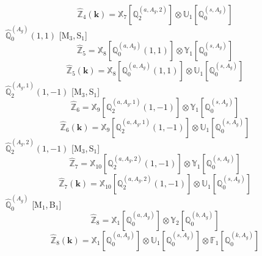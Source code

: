 \documentclass[fleqn,10pt,landscape]{article}
\begin{document}
\begin{itemize}
\begin{dmath*}
\hat{\mathbb{Z}}_{4}(\bm{k})=\mathbb{X}_{7}[\mathbb{Q}_{2}^{(a,A_{g},2)}] \otimes\mathbb{U}_{1}[\mathbb{Q}_{0}^{(s,A_{g})}]
\end{dmath*}
\vspace{4mm}
\noindent {} $\,\,\,\hat{\mathbb{Q}}_{0}^{(A_{g})}(1,1)$ [M$_{3}$,\,S$_{1}$]
\begin{dmath*}
\hat{\mathbb{Z}}_{5}=\mathbb{X}_{8}[\mathbb{Q}_{0}^{(a,A_{g})}(1,1)] \otimes\mathbb{Y}_{1}[\mathbb{Q}_{0}^{(s,A_{g})}]
\end{dmath*}
\begin{dmath*}
\hat{\mathbb{Z}}_{5}(\bm{k})=\mathbb{X}_{8}[\mathbb{Q}_{0}^{(a,A_{g})}(1,1)] \otimes\mathbb{U}_{1}[\mathbb{Q}_{0}^{(s,A_{g})}]
\end{dmath*}
\vspace{4mm}
\noindent {} $\,\,\,\hat{\mathbb{Q}}_{2}^{(A_{g},1)}(1,-1)$ [M$_{3}$,\,S$_{1}$]
\begin{dmath*}
\hat{\mathbb{Z}}_{6}=\mathbb{X}_{9}[\mathbb{Q}_{2}^{(a,A_{g},1)}(1,-1)] \otimes\mathbb{Y}_{1}[\mathbb{Q}_{0}^{(s,A_{g})}]
\end{dmath*}
\begin{dmath*}
\hat{\mathbb{Z}}_{6}(\bm{k})=\mathbb{X}_{9}[\mathbb{Q}_{2}^{(a,A_{g},1)}(1,-1)] \otimes\mathbb{U}_{1}[\mathbb{Q}_{0}^{(s,A_{g})}]
\end{dmath*}
\vspace{4mm}
\noindent {} $\,\,\,\hat{\mathbb{Q}}_{2}^{(A_{g},2)}(1,-1)$ [M$_{3}$,\,S$_{1}$]
\begin{dmath*}
\hat{\mathbb{Z}}_{7}=\mathbb{X}_{10}[\mathbb{Q}_{2}^{(a,A_{g},2)}(1,-1)] \otimes\mathbb{Y}_{1}[\mathbb{Q}_{0}^{(s,A_{g})}]
\end{dmath*}
\begin{dmath*}
\hat{\mathbb{Z}}_{7}(\bm{k})=\mathbb{X}_{10}[\mathbb{Q}_{2}^{(a,A_{g},2)}(1,-1)] \otimes\mathbb{U}_{1}[\mathbb{Q}_{0}^{(s,A_{g})}]
\end{dmath*}
\vspace{4mm}
\noindent {} $\,\,\,\hat{\mathbb{Q}}_{0}^{(A_{g})}$ [M$_{1}$,\,B$_{1}$]
\begin{dmath*}
\hat{\mathbb{Z}}_{8}=\mathbb{X}_{1}[\mathbb{Q}_{0}^{(a,A_{g})}] \otimes\mathbb{Y}_{2}[\mathbb{Q}_{0}^{(b,A_{g})}]
\end{dmath*}
\begin{dmath*}
\hat{\mathbb{Z}}_{8}(\bm{k})=\mathbb{X}_{1}[\mathbb{Q}_{0}^{(a,A_{g})}] \otimes\mathbb{U}_{1}[\mathbb{Q}_{0}^{(s,A_{g})}] \otimes\mathbb{F}_{1}[\mathbb{Q}_{0}^{(k,A_{g})}]
\end{dmath*}

\end{itemize}
\end{document}
